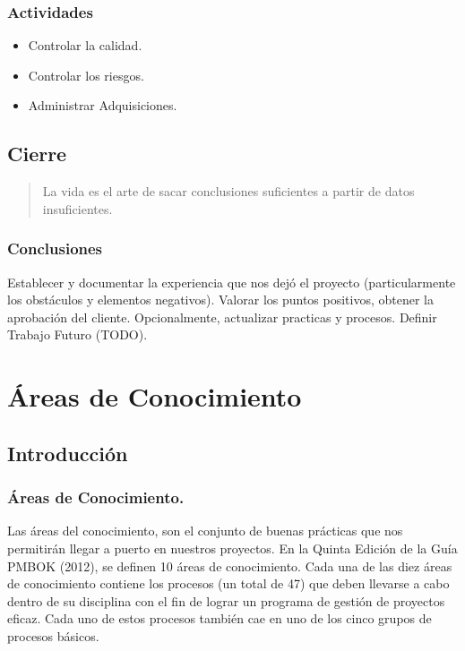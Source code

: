 \documentclass[12pt]{beamer}
\begin{document}
\begin{frame}
 \frametitle{Actividades}
 \begin{itemize}
  \item<1-> Controlar la calidad.
  \item<2-> Controlar los riesgos.
  \item<3-> Administrar Adquisiciones.
 \end{itemize}

\end{frame}


\subsection{Cierre}

\begin{frame}
 \begin{quote}
 La vida es el arte de sacar conclusiones suficientes a partir de datos insuficientes.
 \newline
 \newline
 \end{quote}
\end{frame}

\begin{frame}
 \frametitle{Conclusiones}
 Establecer y documentar la experiencia que nos dejó el proyecto (particularmente los obstáculos y elementos negativos). Valorar los puntos positivos, obtener la aprobación del cliente.
 \pause
 \newline
 Opcionalmente, actualizar practicas y procesos. Definir Trabajo Futuro (TODO).
\end{frame}


\section{Áreas de Conocimiento}
\subsection{Introducción}

\begin{frame}
 \frametitle{Áreas de Conocimiento.}
 
 Las áreas del conocimiento, son el conjunto de buenas prácticas que nos permitirán llegar a puerto en nuestros proyectos.
 \pause
 En la Quinta Edición de la Guía PMBOK (2012), se definen 10 áreas de conocimiento. Cada una de las diez áreas de conocimiento contiene los procesos (un total de 47) que deben llevarse a cabo dentro de su disciplina con el fin de lograr un programa de gestión de proyectos eficaz. Cada uno de estos procesos también cae en uno de los cinco grupos de procesos básicos.
\end{frame}
\end{document}
